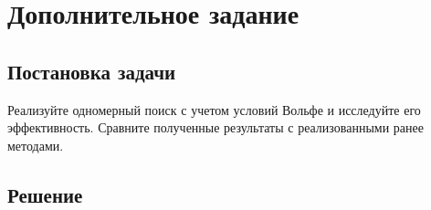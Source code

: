 \documentclass[12pt, a4paper, oneside]{article}
\begin{document}
	\section*{Дополнительное задание}
	\subsection*{Постановка задачи}
	Реализуйте одномерный поиск с учетом условий Вольфе и исследуйте его эффективность. Сравните полученные результаты с реализованными ранее методами.
	\subsection*{Решение}
\end{document}
